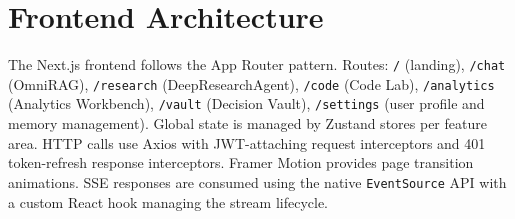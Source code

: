\section{Frontend Architecture}
\label{sec:frontend}

The Next.js frontend follows the App Router pattern. Routes: \texttt{/} (landing), \texttt{/chat} (OmniRAG), \texttt{/research} (DeepResearchAgent), \texttt{/code} (Code Lab), \texttt{/analytics} (Analytics Workbench), \texttt{/vault} (Decision Vault), \texttt{/settings} (user profile and memory management). Global state is managed by Zustand stores per feature area. HTTP calls use Axios with JWT-attaching request interceptors and 401 token-refresh response interceptors. Framer Motion provides page transition animations. SSE responses are consumed using the native \texttt{EventSource} API with a custom React hook managing the stream lifecycle.
